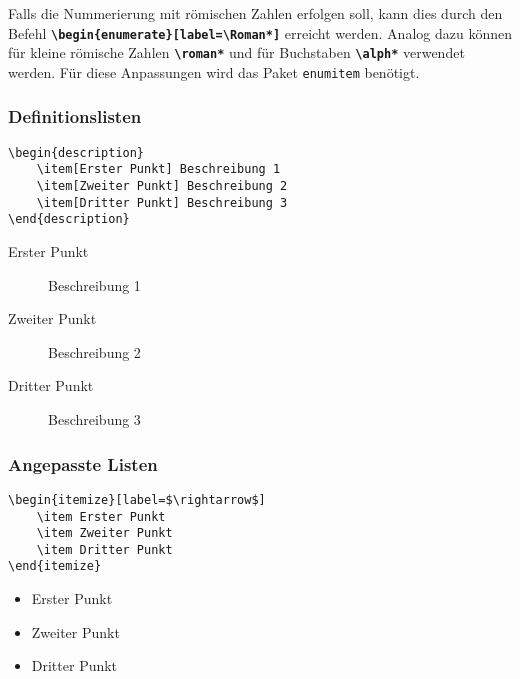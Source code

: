Falls die Nummerierung mit römischen Zahlen erfolgen soll, kann dies durch den Befehl \textbf{\texttt{\textbackslash begin\{enumerate\}[label=\textbackslash Roman*]}} erreicht werden. Analog dazu können für kleine römische Zahlen \textbf{\texttt{\textbackslash roman*}} und für Buchstaben \textbf{\texttt{\textbackslash alph*}} verwendet werden. Für diese Anpassungen wird das Paket \texttt{enumitem} benötigt.

\subsubsection{Definitionslisten}

\begin{minipage}{0.58\textwidth}
    \begin{lstlisting}
\begin{description}
    \item[Erster Punkt] Beschreibung 1
    \item[Zweiter Punkt] Beschreibung 2
    \item[Dritter Punkt] Beschreibung 3
\end{description}
\end{lstlisting}
\end{minipage}
\hfill
\begin{minipage}{0.35\textwidth}
    \begin{description}
        \item[Erster Punkt] Beschreibung 1
        \item[Zweiter Punkt] Beschreibung 2
        \item[Dritter Punkt] Beschreibung 3
    \end{description}
\end{minipage}

\subsubsection{Angepasste Listen}

\begin{minipage}{0.58\textwidth}
    \begin{lstlisting}
\begin{itemize}[label=$\rightarrow$]
    \item Erster Punkt
    \item Zweiter Punkt
    \item Dritter Punkt
\end{itemize}
\end{lstlisting}
\end{minipage}
\hfill
\begin{minipage}{0.35\textwidth}
    \begin{itemize}[label=$\rightarrow$]
        \item Erster Punkt
        \item Zweiter Punkt
        \item Dritter Punkt
    \end{itemize}
\end{minipage}

